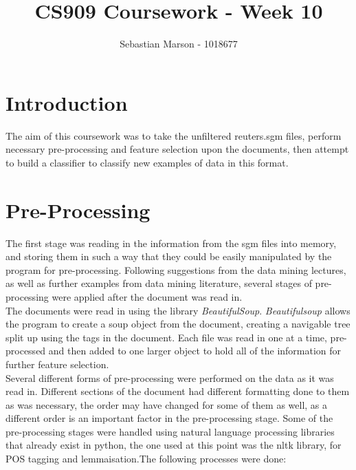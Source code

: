 \documentclass[11pt]{article}
\title{CS909 Coursework - Week 10}
\author{Sebastian Marson - 1018677}
\begin{document}
\maketitle

\section{Introduction}
The aim of this coursework was to take the unfiltered reuters.sgm files, perform necessary pre-processing and feature selection upon the documents, then attempt to build a classifier to classify new examples of data in this format.

\section{Pre-Processing}
The first stage was reading in the information from the sgm files into memory, and storing them in such a way that they could be easily manipulated by the program for pre-processing. Following suggestions from the data mining lectures, as well as further examples from data mining literature, several stages of pre-processing were applied after the document was read in. \\

The documents were read in using the library \textit{BeautifulSoup}. \textit{Beautifulsoup} allows the program to create a soup object from the document, creating a navigable tree split up using the tags in the document. Each file was read in one at a time, pre-processed and then added to one larger object to hold all of the information for further feature selection. \\

Several different forms of pre-processing were performed on the data as it was read in. Different sections of the document had different formatting done to them as was necessary, the order may have changed for some of them as well, as a different order is an important factor in the pre-processing stage. Some of the pre-processing stages were handled using natural language processing libraries that already exist in python, the one used at this point was the nltk library, for POS tagging and lemmaisation.The following processes were done: \\
\end{document}
